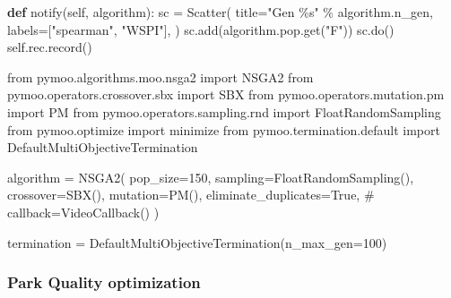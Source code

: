 \documentclass[
  authoryear,
  preprint,
  3p]{elsarticle}
\newenvironment{Shaded}{\begin{snugshade}}{\end{snugshade}}
\newcommand{\CommentTok}[1]{\textcolor[rgb]{0.37,0.37,0.37}{#1}}
\newcommand{\DecValTok}[1]{\textcolor[rgb]{0.68,0.00,0.00}{#1}}
\newcommand{\ImportTok}[1]{\textcolor[rgb]{0.00,0.46,0.62}{#1}}
\newcommand{\KeywordTok}[1]{\textcolor[rgb]{0.00,0.23,0.31}{\textbf{#1}}}
\newcommand{\NormalTok}[1]{\textcolor[rgb]{0.00,0.23,0.31}{#1}}
\newcommand{\OperatorTok}[1]{\textcolor[rgb]{0.37,0.37,0.37}{#1}}
\newcommand{\SpecialCharTok}[1]{\textcolor[rgb]{0.37,0.37,0.37}{#1}}
\newcommand{\StringTok}[1]{\textcolor[rgb]{0.13,0.47,0.30}{#1}}
\newcommand{\VariableTok}[1]{\textcolor[rgb]{0.07,0.07,0.07}{#1}}
\begin{document}
\begin{Shaded}
\begin{Highlighting}[]
    \KeywordTok{def}\NormalTok{ notify(}\VariableTok{self}\NormalTok{, algorithm):}
\NormalTok{        sc }\OperatorTok{=}\NormalTok{ Scatter(}
\NormalTok{            title}\OperatorTok{=}\StringTok{"Gen }\SpecialCharTok{\%s}\StringTok{"} \OperatorTok{\%}\NormalTok{ algorithm.n\_gen,}
\NormalTok{            labels}\OperatorTok{=}\NormalTok{[}\StringTok{"spearman"}\NormalTok{, }\StringTok{"WSPI"}\NormalTok{],}
\NormalTok{        )}
\NormalTok{        sc.add(algorithm.pop.get(}\StringTok{"F"}\NormalTok{))}
\NormalTok{        sc.do()}
        \VariableTok{self}\NormalTok{.rec.record()}
\end{Highlighting}
\end{Shaded}

\begin{Shaded}
\begin{Highlighting}[]
\ImportTok{from}\NormalTok{ pymoo.algorithms.moo.nsga2 }\ImportTok{import}\NormalTok{ NSGA2}
\ImportTok{from}\NormalTok{ pymoo.operators.crossover.sbx }\ImportTok{import}\NormalTok{ SBX}
\ImportTok{from}\NormalTok{ pymoo.operators.mutation.pm }\ImportTok{import}\NormalTok{ PM}
\ImportTok{from}\NormalTok{ pymoo.operators.sampling.rnd }\ImportTok{import}\NormalTok{ FloatRandomSampling}
\ImportTok{from}\NormalTok{ pymoo.optimize }\ImportTok{import}\NormalTok{ minimize}
\ImportTok{from}\NormalTok{ pymoo.termination.default }\ImportTok{import}\NormalTok{ DefaultMultiObjectiveTermination}

\NormalTok{algorithm }\OperatorTok{=}\NormalTok{ NSGA2(}
\NormalTok{    pop\_size}\OperatorTok{=}\DecValTok{150}\NormalTok{,}
\NormalTok{    sampling}\OperatorTok{=}\NormalTok{FloatRandomSampling(),}
\NormalTok{    crossover}\OperatorTok{=}\NormalTok{SBX(),}
\NormalTok{    mutation}\OperatorTok{=}\NormalTok{PM(),}
\NormalTok{    eliminate\_duplicates}\OperatorTok{=}\VariableTok{True}\NormalTok{,}
    \CommentTok{\# callback=VideoCallback()}
\NormalTok{)}

\NormalTok{termination }\OperatorTok{=}\NormalTok{ DefaultMultiObjectiveTermination(n\_max\_gen}\OperatorTok{=}\DecValTok{100}\NormalTok{)}
\end{Highlighting}
\end{Shaded}

\subsubsection{Park Quality
optimization}\label{park-quality-optimization}
\end{document}
